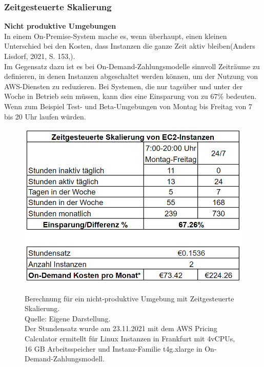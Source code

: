 \subsubsection{Zeitgesteuerte Skalierung}
\textbf{Nicht produktive Umgebungen}\\
In einem On-Premise-System mache es, wenn überhaupt, einen kleinen Unterschied bei den Kosten, dass Instanzen die ganze Zeit aktiv bleiben(Anders Lisdorf, 2021, S. 153,\cite{CCB}).%
\\
Im Gegensatz dazu ist es bei On-Demand-Zahlungsmodelle sinnvoll Zeiträume zu definieren, in denen Instanzen abgeschaltet werden können, um der Nutzung von AWS-Diensten zu reduzieren. Bei Systemen, die nur tagsüber und unter der Woche in Betrieb sein müssen, kann dies eine Einsparung von zu 67\% bedeuten.  Wenn zum Beispiel Test- und Beta-Umgebungen von Montag bis Freitag von 7 bis 20 Uhr laufen würden.
\begin{figure}[h]
  \centering
  \includegraphics[scale=0.6]{sources/Einsparung_Zeitgesteuerte_Skalierung}
  \caption[Berechnung für ein nicht produktives Umgebung mit Zeitgesteuerte Skalierung]{}
  \label{fig:Einsparung_Zeitgesteuerte_Skalierung} 
  Berechnung für ein nicht-produktive Umgebung mit Zeitgesteuerte Skalierung. \\
  Quelle: Eigene Darstellung.\\ 
  Der Stundensatz wurde am 23.11.2021 mit dem AWS Pricing Calculator ermitellt für Linux Instanzen in Frankfurt mit 4vCPUs, 16 GB Arbeitsspeicher und Instanz-Familie t4g.xlarge in On-Demand-Zahlungsmodell\cite{AMZ17}.
\end{figure}
